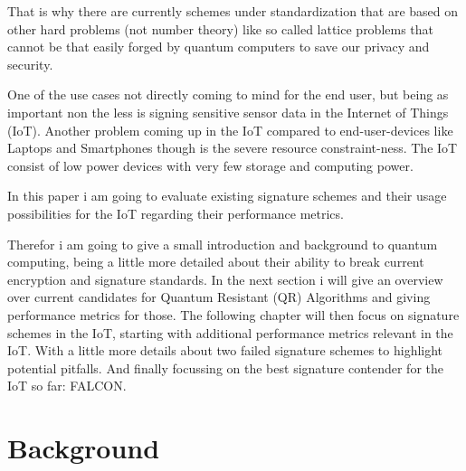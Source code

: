 \documentclass[conference]{IEEEtran}
\begin{document}
That is why there are currently schemes under standardization\cite{PQClean-GH} that are based on other hard problems (not number theory) like so called lattice problems that cannot be that easily forged by quantum computers to save our privacy and security.

One of the use cases not directly coming to mind for the end user, but being as important non the less is signing sensitive sensor data in the Internet of Things (IoT).
Another problem coming up in the IoT compared to end-user-devices like Laptops and Smartphones though is the severe resource constraint-ness. 
The IoT consist of low power devices with very few storage and computing power.

In this paper i am going to evaluate existing signature schemes and their usage possibilities for the IoT regarding their performance metrics.

Therefor i am going to give a small introduction and background to quantum computing, being a little more detailed about their ability to break current encryption and signature standards.
In the next section i will give an overview over current candidates for Quantum Resistant (QR) Algorithms and giving performance metrics for those.
The following chapter will then focus on signature schemes in the IoT, starting with additional performance metrics relevant in the IoT.
With a little more details about two failed signature schemes to highlight potential pitfalls. 
And finally focussing on the best signature contender for the IoT so far: FALCON.

\section{Background}
\end{document}
